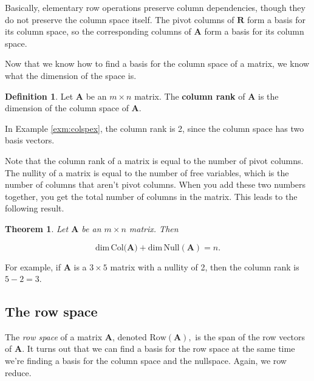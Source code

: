 \documentclass[
]{book}
\newtheorem{theorem}{Theorem}[chapter]
\theoremstyle{definition}
\newtheorem{definition}{Definition}[chapter]
\theoremstyle{definition}
\theoremstyle{definition}
\theoremstyle{definition}
\theoremstyle{remark}
\begin{document}
Basically, elementary row operations preserve column dependencies, though they do not preserve the column space itself. The pivot columns of \(\mathbf{R}\) form a basis for its column space, so the corresponding columns of \(\mathbf{A}\) form a basis for its column space.

Now that we know how to find a basis for the column space of a matrix, we know what the dimension of the space is.

\begin{defbox}

\begin{definition}
Let \(\mathbf{A}\) be an \(m\times n\) matrix. The \textbf{column rank} of \(\mathbf{A}\) is the dimension of the column space of \(\mathbf{A}.\)
\end{definition}

\end{defbox}

In Example \ref{exm:colspex}, the column rank is 2, since the column space has two basis vectors.

Note that the column rank of a matrix is equal to the number of pivot columns. The nullity of a matrix is equal to the number of free variables, which is the number of columns that aren't pivot columns. When you add these two numbers together, you get the total number of columns in the matrix. This leads to the following result.

\begin{theorembox}

\begin{theorem}
Let \(\mathbf{A}\) be an \(m\times n\) matrix. Then

\[\text{dim}\, \text{Col}(\mathbf{A)}+\text{dim}\, \text{Null}(\mathbf{A})=n.\]
\end{theorem}

\end{theorembox}

For example, if \(\mathbf{A}\) is a \(3\times 5\) matrix with a nullity of 2, then the column rank is \(5-2=3\).

\subsection*{The row space}\label{the-row-space}

The \emph{row space} of a matrix \(\mathbf{A}\), denoted \(\text{Row}(\mathbf{A}),\) is the span of the row vectors of \(\mathbf{A}.\) It turns out that we can find a basis for the row space at the same time we're finding a basis for the column space and the nullspace. Again, we row reduce.
\end{document}

